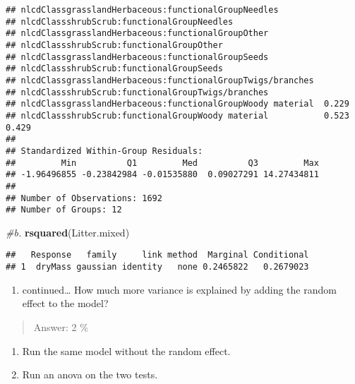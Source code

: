\documentclass[]{article}
\newenvironment{Shaded}{\begin{snugshade}}{\end{snugshade}}
\newcommand{\KeywordTok}[1]{\textcolor[rgb]{0.13,0.29,0.53}{\textbf{#1}}}
\newcommand{\CommentTok}[1]{\textcolor[rgb]{0.56,0.35,0.01}{\textit{#1}}}
\newcommand{\NormalTok}[1]{#1}
\providecommand{\tightlist}{%
  \setlength{\itemsep}{0pt}\setlength{\parskip}{0pt}}
\begin{document}
\begin{verbatim}
## nlcdClassgrasslandHerbaceous:functionalGroupNeedles                     
## nlcdClassshrubScrub:functionalGroupNeedles                              
## nlcdClassgrasslandHerbaceous:functionalGroupOther                       
## nlcdClassshrubScrub:functionalGroupOther                                
## nlcdClassgrasslandHerbaceous:functionalGroupSeeds                       
## nlcdClassshrubScrub:functionalGroupSeeds                                
## nlcdClassgrasslandHerbaceous:functionalGroupTwigs/branches              
## nlcdClassshrubScrub:functionalGroupTwigs/branches                       
## nlcdClassgrasslandHerbaceous:functionalGroupWoody material  0.229       
## nlcdClassshrubScrub:functionalGroupWoody material           0.523  0.429
## 
## Standardized Within-Group Residuals:
##         Min          Q1         Med          Q3         Max 
## -1.96496855 -0.23842984 -0.01535880  0.09027291 14.27434811 
## 
## Number of Observations: 1692
## Number of Groups: 12
\end{verbatim}

\begin{Shaded}
\begin{Highlighting}[]
\CommentTok{#b.}
\KeywordTok{rsquared}\NormalTok{(Litter.mixed)}
\end{Highlighting}
\end{Shaded}

\begin{verbatim}
##   Response   family     link method  Marginal Conditional
## 1  dryMass gaussian identity   none 0.2465822   0.2679023
\end{verbatim}

\begin{enumerate}
\def\labelenumi{\alph{enumi}.}
\setcounter{enumi}{1}
\tightlist
\item
  continued\ldots{} How much more variance is explained by adding the
  random effect to the model?
\end{enumerate}

\begin{quote}
Answer: 2 \%
\end{quote}

\begin{enumerate}
\def\labelenumi{\alph{enumi}.}
\setcounter{enumi}{2}
\tightlist
\item
  Run the same model without the random effect.
\item
  Run an anova on the two tests.
\end{enumerate}
\end{document}
